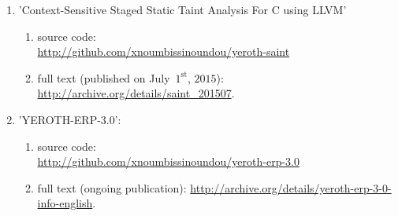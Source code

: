 \begin{enumerate}
	\item 'Context-Sensitive Staged Static Taint Analysis
			For C using LLVM'
		\begin{enumerate}[1.]
			\itemsep -0.7em
			\item source code: \\
			\url{http://github.com/xnoumbissinoundou/yeroth-saint}
			\item full text (published on July~$1^\text{st}$, $2015$): \url{http://archive.org/details/saint_201507}.
		\end{enumerate}		 

	\item 'YEROTH-ERP-3.0':
			\begin{enumerate}[1.]
			\itemsep -0.7em
			\item source code: \\
			\url{http://github.com/xnoumbissinoundou/yeroth-erp-3.0}
			\item full text (ongoing publication): \url{http://archive.org/details/yeroth-erp-3-0-info-english}.
		\end{enumerate}	
\end{enumerate}
